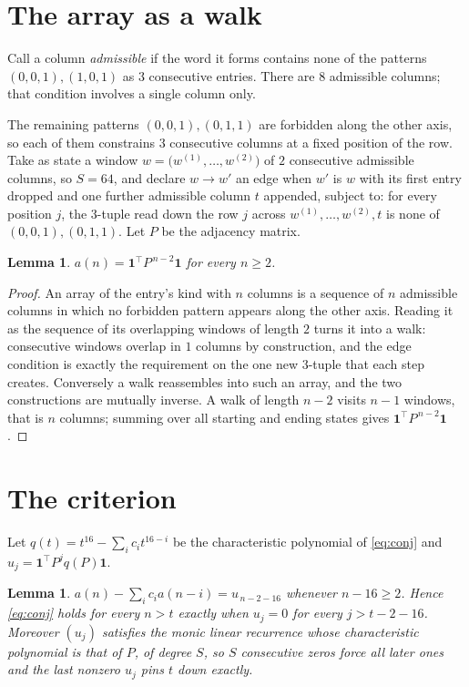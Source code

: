\documentclass[11pt,a4paper]{article}
\theoremstyle{plain}
\newtheorem{lemma}[theorem]{Lemma}
\theoremstyle{definition}
\begin{document}
\section{The array as a walk}

Call a column \emph{admissible} if the word it forms contains none of the patterns
$(0,0,1), (1,0,1)$ as $3$ consecutive entries. There are $8$ admissible columns; that condition
involves a single column only.

The remaining patterns $(0,0,1), (0,1,1)$ are forbidden along the other axis, so each of them
constrains $3$ consecutive columns at a fixed position of the row. Take as state a
window $w=\bigl(w^{(1)},\dots,w^{(2)}\bigr)$ of $2$ consecutive admissible
columns, so $S=64$, and declare $w\to w'$ an edge when $w'$ is $w$ with its first entry
dropped and one further admissible column $t$ appended, subject to: for every position
$j$, the $3$-tuple read down the row $j$ across $w^{(1)},\dots,w^{(2)},t$
is none of $(0,0,1), (0,1,1)$. Let $P$ be the adjacency matrix.

\begin{lemma}\label{lem:walk}
$a(n)=\mathbf{1}^{\!\top}P^{\,n-2}\mathbf{1}$ for every $n\ge2$.
\end{lemma}

\begin{proof}
An array of the entry's kind with $n$ columns is a sequence of $n$ admissible columns in
which no forbidden pattern appears along the other axis. Reading it as the sequence of its
overlapping windows of length $2$ turns it into a walk: consecutive windows overlap in
$1$ columns by construction, and the edge condition is exactly the requirement on the one
new $3$-tuple that each step creates. Conversely a walk reassembles into such an array,
and the two constructions are mutually inverse. A walk of length $n-2$ visits $n-1$
windows, that is $n$ columns; summing over all starting and ending states gives
$\mathbf{1}^{\!\top}P^{\,n-2}\mathbf{1}$.
\end{proof}

\section{The criterion}

Let $q(t)=t^{16}-\sum_i c_i t^{16-i}$ be the characteristic polynomial of
\eqref{eq:conj} and $u_j=\mathbf{1}^{\!\top}P^{j}q(P)\mathbf{1}$.

\begin{lemma}\label{lem:crit}
$a(n)-\sum_i c_i a(n-i)=u_{\,n-2-16}$ whenever $n-16\ge2$. Hence
\eqref{eq:conj} holds for every $n>t$ exactly when $u_j=0$ for every
$j>t-2-16$. Moreover $(u_j)$ satisfies the monic linear recurrence whose
characteristic polynomial is that of $P$, of degree $S$, so $S$ consecutive zeros force all
later ones and the last nonzero $u_j$ pins $t$ down exactly.
\end{lemma}
\end{document}
